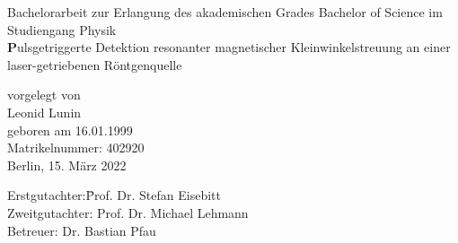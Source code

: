 \begin{titlepage}
\vspace{2cm}

\thispagestyle{empty}
\begin{center}

{\large Bachelorarbeit zur Erlangung des akademischen Grades
Bachelor of Science
im Studiengang Physik}\\
\vspace{1cm}
{\huge\textbf
Pulsgetriggerte Detektion resonanter magnetischer Kleinwinkelstreuung an einer laser-getriebenen Röntgenquelle}
\vspace{1.2cm}

{\large vorgelegt von\\
	 Leonid Lunin \\
	 geboren am 16.01.1999\\
	 Matrikelnummer: 402920\\[2cm]
	 Berlin, 15. März 2022\\[2cm]
}

\begin{minipage}{\linewidth} 
\begin{tabbing}
  		Erstgutachter:\quad \= Prof. Dr. Stefan Eisebitt\\[0.3cm]
  		Zweitgutachter: \> Prof. Dr. Michael Lehmann\\[0.3cm]
    	Betreuer:             \> Dr. Bastian Pfau \\
    						         
\end{tabbing}
\end{minipage}

\vspace{1.5cm}

\end{center}
\thispagestyle{empty}
\newpage
\setcounter{page}{1}
\end{titlepage}

\shipout\null
